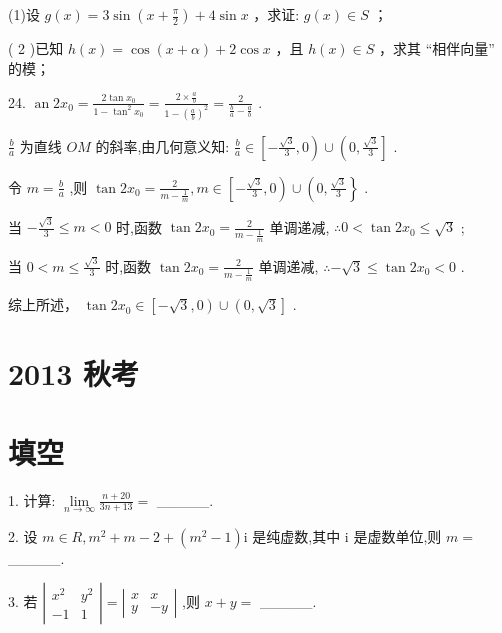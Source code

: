 \documentclass[10pt]{article}
\begin{document}
(1)设 \(g\left( x\right)  = 3\sin \left( {x + \frac{\pi }{2}}\right)  + 4\sin x\) ，求证: \(g\left( x\right)  \in  S\) ；

( 2 )已知 \(h\left( x\right)  = \cos \left( {x + \alpha }\right)  + 2\cos x\) ，且 \(h\left( x\right)  \in  S\) ，求其 “相伴向量” 的模；

24. \(\operatorname{an}2{x}_{0} = \frac{2\tan {x}_{0}}{1 - {\tan }^{2}{x}_{0}} = \frac{2 \times  \frac{a}{b}}{1 - {\left( \frac{a}{b}\right) }^{2}} = \frac{2}{\frac{b}{a} - \frac{a}{b}}\) .

\(\frac{b}{a}\) 为直线 \({OM}\) 的斜率,由几何意义知: \(\frac{b}{a} \in  \left\lbrack  {-\frac{\sqrt{3}}{3},0}\right)  \cup  \left( {0,\frac{\sqrt{3}}{3}}\right\rbrack\) .

令 \(m = \frac{b}{a}\) ,则 \(\tan 2{x}_{0} = \frac{2}{m - \frac{1}{m}},m \in  \left\lbrack  {-\frac{\sqrt{3}}{3},0}\right)  \cup  \left( {0,\frac{\sqrt{3}}{3}}\right\}\) .

当 \(- \frac{\sqrt{3}}{3} \leq  m < 0\) 时,函数 \(\tan 2{x}_{0} = \frac{2}{m - \frac{1}{m}}\) 单调递减, \(\therefore 0 < \tan 2{x}_{0} \leq  \sqrt{3}\) ;

当 \(0 < m \leq  \frac{\sqrt{3}}{3}\) 时,函数 \(\tan 2{x}_{0} = \frac{2}{m - \frac{1}{m}}\) 单调递减, \(\therefore  - \sqrt{3} \leq  \tan 2{x}_{0} < 0\) .

综上所述， \(\tan 2{x}_{0} \in  \left\lbrack  {-\sqrt{3},0}\right)  \cup  \left( {0,\sqrt{3}}\right\rbrack\) .

\section*{2013 秋考}

\section*{填空}

1. 计算: \(\mathop{\lim }\limits_{{n \rightarrow  \infty }}\frac{n + {20}}{{3n} + {13}} =\) \_\_\_\_\_.

2. 设 \(m \in  R,{m}^{2} + m - 2 + \left( {{m}^{2} - 1}\right) \mathrm{i}\) 是纯虚数,其中 \(\mathrm{i}\) 是虚数单位,则 \(m =\) \_\_\_\_\_.

3. 若 \(\left| \begin{matrix} {x}^{2} & {y}^{2} \\   - 1 & 1 \end{matrix}\right|  = \left| \begin{matrix} x & x \\  y &  - y \end{matrix}\right|\) ,则 \(x + y =\) \_\_\_\_\_.
\end{document}
